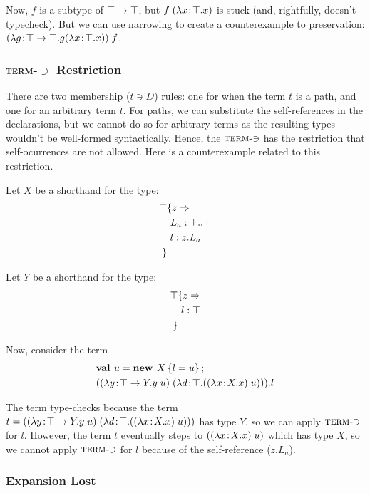 \documentclass[preprint]{sigplanconf}
\begin{document}
Now, $f$ is a subtype of $\top \rightarrow \top$, but $f\;(\lambda x\!:\!\top.x)$ is stuck (and, rightfully, doesn't typecheck). But we can use
narrowing to create a counterexample to preservation: $(\lambda g\!:\!\top \rightarrow \top.g (\lambda x\!:\!\top.x))\;f$.

\subsubsection{\texorpdfstring{\textsc{term-$\ni$}}{Term-Mem} Restriction}\label{term_mem}

There are two membership ($t \ni D$) rules: one for when the term $t$
is a path, and one for an arbitrary term $t$. For paths, we can
substitute the self-references in the declarations, but we cannot do
so for arbitrary terms as the resulting types wouldn't be well-formed
syntactically. Hence, the $\textsc{term-$\ni$}$ has the restriction
that self-ocurrences are not allowed. Here is a counterexample related
to this restriction.

Let $X$ be a shorthand for the type:
\begin{align*}
\top & \{z \Rightarrow \\
&\ L_a : \top..\top\\
&\ l : z.L_a\\
 \}&
\end{align*}

Let $Y$ be a shorthand for the type:
\begin{align*}
\top & \{z \Rightarrow \\
&\ l : \top\\
 \}&
\end{align*}

Now, consider the term
\begin{align*}
&\mlnew u {X \ldefs{ l = u }}{
(\app {(\abs y {\Top \tfun Y} {\app y u})} {(\abs d \Top {(\app {(\abs x X x)} u)})}).l
}
\end{align*}

The term type-checks because the term $t=((\lambda y\!:\!\top \rightarrow Y.y\;u)\;(\lambda d\!:\!\top.((\lambda x\!:\!X.x)\;u)))$ has type
$Y$, so we can apply $\textsc{term-$\ni$}$ for $l$. However, the term
$t$ eventually steps to $((\lambda x\!:\!X.x)\;u)$ which has type $X$,
so we cannot apply $\textsc{term-$\ni$}$ for $l$ because of the
self-reference ($z.L_a$).

\subsubsection{Expansion Lost}\label{narrowing_exp}
\end{document}
